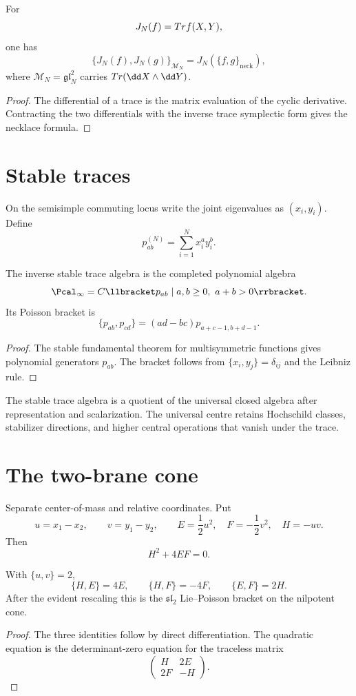 \begin{theorem}
For
\[
 J_N(f)=Tr f(X,Y),
\]
one has
\[
 \{J_N(f),J_N(g)\}_{\mathcal M_N}
 =J_N\!\left(\{f,g\}_{\mathrm{neck}}\right),
\]
where $\mathcal M_N=\mathfrak{gl}_N^2$ carries $\Tr(\dd X\wedge\dd Y)$.
\end{theorem}
\begin{proof}
The differential of a trace is the matrix evaluation of the cyclic derivative.  Contracting the two differentials with the inverse trace symplectic form gives the necklace formula.
\end{proof}

\chapter{Stable traces}
On the semisimple commuting locus write the joint eigenvalues as $(x_i,y_i)$.  Define
\[
 p_{ab}^{(N)}=\sum_{i=1}^{N}x_i^ay_i^b.
\]

\begin{theorem}
The inverse stable trace algebra is the completed polynomial algebra
\[
 \Pcal_\infty=
 \C\llbracket p_{ab}\mid a,b\ge0,\ a+b>0\rrbracket.
\]
Its Poisson bracket is
\[
 \{p_{ab},p_{cd}\}
 =(ad-bc)p_{a+c-1,b+d-1}.
\]
\end{theorem}
\begin{proof}
The stable fundamental theorem for multisymmetric functions gives polynomial generators $p_{ab}$.  The bracket follows from $\{x_i,y_j\}=\delta_{ij}$ and the Leibniz rule.
\end{proof}

\begin{remark}
The stable trace algebra is a quotient of the universal closed algebra after representation and scalarization.  The universal centre retains Hochschild classes, stabilizer directions, and higher central operations that vanish under the trace.
\end{remark}

\chapter{The two-brane cone}
Separate center-of-mass and relative coordinates.  Put
\[
 u=x_1-x_2,
 \qquad
 v=y_1-y_2,
 \qquad
 E=\frac12u^2,
 \quad
 F=-\frac12v^2,
 \quad
 H=-uv.
\]
Then
\[
 H^2+4EF=0.
\]

\begin{proposition}
With $\{u,v\}=2$,
\[
 \{H,E\}=4E,
 \qquad
 \{H,F\}=-4F,
 \qquad
 \{E,F\}=2H.
\]
After the evident rescaling this is the $\mathfrak{sl}_2$ Lie--Poisson bracket on the nilpotent cone.
\end{proposition}
\begin{proof}
The three identities follow by direct differentiation.  The quadratic equation is the determinant-zero equation for the traceless matrix
\[
 \begin{pmatrix}H&2E\\2F&-H\end{pmatrix}.
\]
\end{proof}


